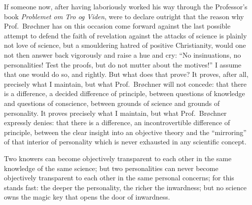 \documentclass[12pt]{book}
\begin{document}
If someone now, after having laboriously worked his way through the
Professor's book \emph{Problemet om Tro og Viden}, were to declare outright
that the reason why Prof.\ Brøchner has on this occasion come forward
against the last possible attempt to defend the faith of revelation against
the attacks of science is plainly not love of science, but a smouldering
hatred of positive Christianity, would one not then answer back vigorously
and raise a hue and cry: ``No insinuations, no personalities! Test the
proofs, but do not mutter about the motives!'' I assume that one would do
so, and rightly. But what does that prove? It proves, after all, precisely
what I maintain, but what Prof.\ Brøchner will not concede: that there is a
difference, a decided difference of principle, between questions of
knowledge and questions of conscience, between grounds of science and
grounds of personality. It proves precisely what I maintain, but what Prof.\
Brøchner expressly denies: that there is a difference, an incontrovertible
difference of principle, between the clear insight into an objective theory
and the ``mirroring'' of that interior of personality which is never
exhausted in any scientific concept.

Two knowers can become objectively transparent to each other in the same
knowledge of the same science; but two personalities can never become
objectively transparent to each other in the same personal concerns; for
this stands fast: the deeper the personality, the richer the inwardness; but
no science owns the magic key that opens the door of inwardness.
\end{document}
